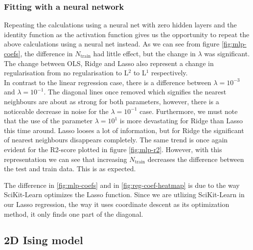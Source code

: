 \subsubsection{Fitting with a neural network}
Repeating the calculations using a neural net with zero hidden layers and the identity function as the activation function gives us the opportunity to repeat the above calculations using a neural net instead. As we can see from figure \ref{fig:mlp-coefs}, the difference in $N_{\text{train}}$ had little effect, but the change in $\lambda$ was significant. The change between OLS, Ridge and Lasso also represent a change in regularisation from no regularisation to L$^2$ to L$^1$ respectively. \\
In contrast to the linear regression case, there is a difference between $\lambda = 10^{-3}$ and $\lambda = 10^{-1}$. The diagonal lines once removed which signifies the nearest neighbours are about as strong for both parameters, however, there is a noticeable decrease in noise for the $\lambda = 10^{-1}$ case. Furthermore, we must note that the use of the parameter $\lambda = 10^{1}$ is more devastating for Ridge than Lasso this time around. Lasso looses a lot of information, but for Ridge the significant of nearest neighbours disappears completely. The same trend is once again evident for the R2-score plotted in figure \ref{fig:mlp-r2}. However, with this representation we can see that increasing $N_{\text{train}}$ decreases the difference between the test and train data. This is as expected.

The difference in \ref{fig:mlp-coefs} and in \ref{fig:reg-coef-heatmap} is due to the way SciKit-Learn optimizes the Lasso function. Since we are utlizing SciKit-Learn in our Lasso regression, the way it uses coordinate descent as its optimization method, it only finds one part of the diagonal.
\subsection{2D Ising model}
